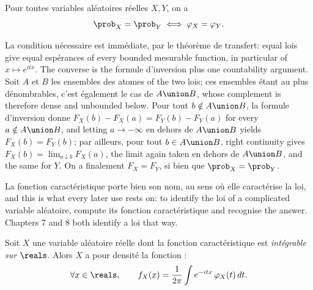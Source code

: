 \begin{corollary}
Pour toutes variables aléatoires réelles $X, Y$, on a
\[
  \prob_{X} = \prob_{Y} \iff \varphi_{X} = \varphi_{Y}.
\]
\end{corollary}

\begin{remark}
La condition nécessaire est immédiate, par le théorème de transfert: equal lois give equal
espérances of every bounded mesurable function, in particular of $x \mapsto e^{itx}$. The
converse is the formule d'inversion plus one countability argument. Soit $A$ et $B$ les
ensembles des atomes of the two lois; ces ensembles étant au plus dénombrables, c'est
également le cas de $A \union B$, whose complement is therefore dense and unbounded below.
Pour tout $b \notin A \union B$, la formule d'inversion donne $F_{X}(b) -
F_{X}(a) = F_{Y}(b) - F_{Y}(a)$ for every $a \notin A \union B$, and letting $a \to -\infty$
en dehors de $A \union B$ yields $F_{X}(b) = F_{Y}(b)$; par ailleurs, pour tout
$b \in A \union B$, right continuity gives $F_{X}(b) = \lim_{a \downarrow b} F_{X}(a)$, the
limit again taken en dehors de $A \union B$, and the same for $Y$. On a finalement
$F_{X} = F_{Y}$, si bien que $\prob_{X} = \prob_{Y}$.
\end{remark}

La fonction caractéristique porte bien son nom, au sens où elle caractérise la loi, and this
is what every later use rests on: to identify the loi of a complicated variable aléatoire,
compute its fonction caractéristique and recognise the answer. Chapters 7 and 8 both identify
a loi that way.

\begin{corollary}
Soit $X$ une variable aléatoire réelle dont la fonction caractéristique est \emph{intégrable
sur $\reals$}. Alors $X$ a pour densité la fonction :
\[
  \forall x \in \reals, \qquad f_{X}(x) = \frac{1}{2\pi}\int e^{-itx}\,\varphi_{X}(t)\,dt.
\]
\end{corollary}

